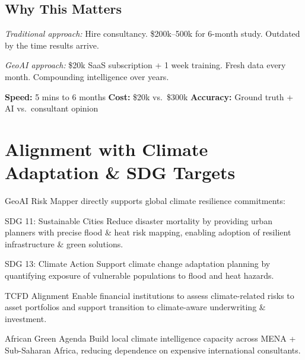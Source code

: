 \documentclass[11pt, a4paper]{article}
\begin{document}
\vspace{8pt}

\subsection*{Why This Matters}

\textit{Traditional approach:} Hire consultancy. \$200k–500k for 6-month study. Outdated by the time results arrive.

\textit{GeoAI approach:} \$20k SaaS subscription + 1 week training. Fresh data every month. Compounding intelligence over years.

\begin{center}
\textbf{Speed:} 5 mins to 6 months \quad \textbf{Cost:} \$20k vs.\ \$300k \quad \textbf{Accuracy:} Ground truth + AI vs.\ consultant opinion
\end{center}

\section{Alignment with Climate Adaptation \& SDG Targets}

GeoAI Risk Mapper directly supports global climate resilience commitments:

\begin{minipage}[t]{0.48\linewidth}
\begin{kpibox}[accentdark]{SDG 11: Sustainable Cities}
  Reduce disaster mortality by providing urban planners with precise flood \& heat risk
  mapping, enabling adoption of resilient infrastructure \& green solutions.
\end{kpibox}
\end{minipage}\hfill
\begin{minipage}[t]{0.48\linewidth}
\begin{kpibox}[emerald]{SDG 13: Climate Action}
  Support climate change adaptation planning by quantifying exposure of vulnerable
  populations to flood and heat hazards.
\end{kpibox}
\end{minipage}

\begin{minipage}[t]{0.48\linewidth}
\begin{kpibox}[amber]{TCFD Alignment}
  Enable financial institutions to assess climate-related risks to asset portfolios
  and support transition to climate-aware underwriting \& investment.
\end{kpibox}
\end{minipage}\hfill
\begin{minipage}[t]{0.48\linewidth}
\begin{kpibox}[danger]{African Green Agenda}
  Build local climate intelligence capacity across MENA + Sub-Saharan Africa,
  reducing dependence on expensive international consultants.
\end{kpibox}
\end{minipage}
\end{document}
